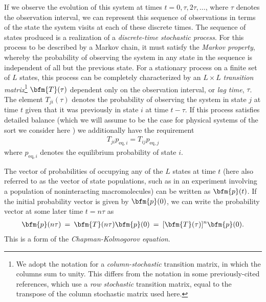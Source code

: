 If we observe the evolution of this system at times $t = 0, \tau, 2 \tau, \ldots$, where $\tau$ denotes the observation interval, we can represent this sequence of observations in terms of the state the system visits at each of these discrete times.
The sequence of states produced is a realization of a \emph{discrete-time stochastic process}.
For this process to be described by a Markov chain, it must satisfy the \emph{Markov property}, whereby the probability of observing the system in any state in the sequence is independent of all but the previous state.
For a stationary process on a finite set of $L$ states, this process can be completely characterized by an $L \times L$ \emph{transition matrix}\footnote{We adopt the notation for a \emph{column-stochastic} transition matrix, in which the columns sum to unity.  This differs from the notation in some previously-cited references, which use a \emph{row stochastic} transition matrix, equal to the transpose of the column stochastic matrix used here.} $\bfm{T}(\tau)$ dependent only on the observation interval, or \emph{lag time}, $\tau$.
The element $T_{ji}(\tau)$ denotes the probability of observing the system in state $j$ at time $t$ given that it was previously in state $i$ at time $t-\tau$.
If this process satisfies detailed balance (which we will assume to be the case for physical systems of the sort we consider here \cite{vankampen}) we additionally have the requirement
\begin{eqnarray}
T_{ji} p_{\mathrm{eq},i} = T_{ij} p_{\mathrm{eq},j}
\end{eqnarray}
where $p_{\mathrm{eq},i}$ denotes the equilibrium probability of state $i$.

The vector of probabilities of occupying any of the $L$ states at time $t$ (here also referred to as the vector of state populations, such as in an experiment involving a population of noninteracting macromolecules) can be written as $\bfm{p}(t)$.
If the initial probability vector is given by $\bfm{p}(0)$, we can write the probability vector at some later time $t=n\tau$ as
\begin{eqnarray}
\bfm{p}(n \tau) \: = \: \bfm{T}(n \tau) \bfm{p}(0) \: = \: [\bfm{T}(\tau)]^n \bfm{p}(0) . \label{equation:chapman-kolmogorov}
\end{eqnarray}
This is a form of the \emph{Chapman-Kolmogorov equation}.

